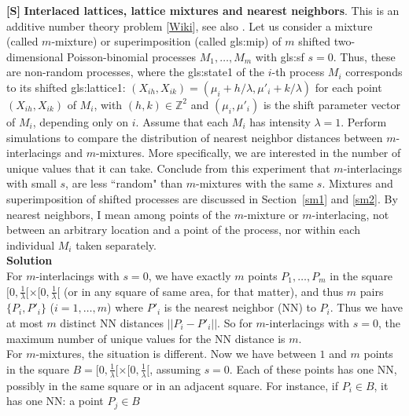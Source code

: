 \documentclass[10pt]{article}
\begin{document}
\begin{Exercise}\label{exercise14e}{\bf [S]} {\bf Interlaced lattices, lattice mixtures and nearest neighbors}.  This is an additive number theory problem [\href{https://en.wikipedia.org/wiki/Additive_number_theory}{Wiki}], see also \cite{ant}.
Let us consider a \textcolor{index}{mixture} (called \textcolor{index}{$m$-mixture}) or
\textcolor{index}{superimposition} (called \gls{gls:mip})
of $m$ \textcolor{index}{shifted} two-dimensional Poisson-binomial processes $M_1,\dots,M_m$ with \gls{gls:sf} 
$s=0$.  Thus, these are  non-random processes, where the \gls{gls:state1} of the $i$-th process $M_i$ corresponds to its shifted \gls{gls:lattice1}: $(X_{ih},X_{ik})=(\mu_i+h/\lambda,\mu'_i+k/\lambda)$ for each point $(X_{ih},X_{ik})$
of $M_i$, with $(h,k)\in\mathbb{Z}^2$ and $(\mu_i,\mu'_i)$ is the shift parameter vector of $M_i$, depending only on $i$. Assume that each $M_i$ has intensity $\lambda=1$. Perform simulations to
compare the distribution of \textcolor{index}{nearest neighbor distances} between $m$-interlacings and $m$-mixtures.  More specifically, we are interested in the number of unique values that it can take. Conclude from this experiment that $m$-interlacings with small $s$, are less ``random" than $m$-mixtures with the same $s$. Mixtures and superimposition of shifted processes are discussed in Section~\ref{sm1} and \ref{sm2}. By nearest neighbors, I mean among points of the $m$-mixture or $m$-interlacing, not between an arbitrary location and a point of the process, nor within each individual $M_i$ taken separately. \vspace{1ex} \\
{\bf Solution}\vspace{1ex} \\
For $m$-interlacings with $s=0$, we have exactly $m$ points $P_1,\dots,P_m$ in the square $[0, \frac{1}{\lambda}[ \times [0, \frac{1}{\lambda}[$ (or in any square of same area, for that matter), and thus $m$ pairs $\{P_i, P'_i\}$  ($i=1,\dots,m$) where $P'_i$ is the nearest neighbor (NN) to $P_i$.
Thus we have at most $m$ distinct NN distances $||P_i-P'_i||$. So for $m$-interlacings with $s=0$, the maximum number of unique values for the NN distance is $m$. \vspace{1ex} \\
For $m$-mixtures, the situation is different. Now we have between $1$ and $m$ points in the square $B=[0, \frac{1}{\lambda}[ \times [0, \frac{1}{\lambda}[$, assuming $s=0$. Each of these points has one NN, possibly in the same square or in an adjacent square. For instance, if $P_i\in B$, it has one NN: a point $P_j\in B$

\end{Exercise}
\end{document}
